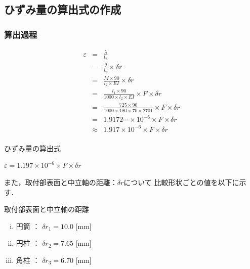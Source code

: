 \documentclass[twocolumn,a4j]{jsarticle}
\begin{document}
\subsection{ひずみ量の算出式の作成}

\subsubsection{算出過程}
\begin{eqnarray*}
    \varepsilon &=& \frac{\lambda}{l_2}\\
    &=& \frac{\theta}{l_2} × \delta r\\
    &=& \frac{M × 90}{l_2 × EI} × \delta r\\
    &=& \frac{l_1 × 90}{1000 × l_2 × EI} × F × \delta r\\
    &=& \frac{725 × 90}{1000 × 180 × 70 × 2701} × F × \delta r\\
    &=& 1.9172 \cdots × 10^{-6} × F × \delta r\\
    &\approx& 1.917 × 10^{-6} × F × \delta r\\
\end{eqnarray*}

\begin{itembox}[l]{ひずみ量の算出式}
    \begin{center}
        $\displaystyle \varepsilon = 1.197 × 10^{-6} × F × \delta r$
    \end{center}
\end{itembox}

また，取付部表面と中立軸の距離：$\delta r$について
比較形状ごとの値を以下に示す．


\begin{itembox}[l]{取付部表面と中立軸の距離}
    \begin{enumerate}[(i)]
        \item 円筒 ： $\delta r_1 = 10.0$ [mm]
        \item 円柱 ： $\delta r_2 = 7.65$ [mm]
        \item 角柱 ： $\delta r_3 = 6.70$ [mm]
    \end{enumerate}
\end{itembox}
\end{document}
